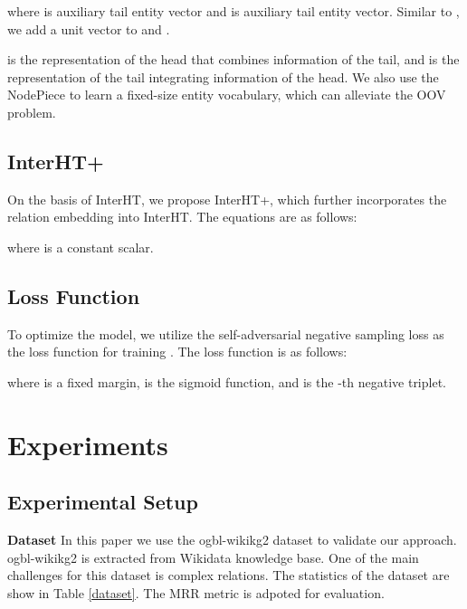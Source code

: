 \documentclass[11pt]{article}
\begin{document}
where  is auxiliary tail entity vector and  is auxiliary tail entity vector. Similar to \citet{long2021triplere}, we add a unit vector  to  and .



 is the representation of the head that combines information of the tail, and  is the representation of the tail integrating information of the head. We also use the NodePiece to learn a fixed-size entity vocabulary, which can alleviate the OOV problem.

\subsection{InterHT+}
On the basis of InterHT, we propose InterHT+, which further incorporates the relation embedding into InterHT. The equations are as follows:

where  is a constant scalar.

\subsection{Loss Function}
To optimize the model, we utilize the self-adversarial negative sampling loss as the loss function for training \cite{sun2019rotate}. The loss function is as follows:

where  is a fixed margin,  is the sigmoid function, and  is the -th negative triplet.

\section{Experiments}
\subsection{Experimental Setup}
\noindent\textbf{Dataset} In this paper we use the ogbl-wikikg2 dataset to validate our approach. ogbl-wikikg2 is extracted from Wikidata knowledge base. One of the main challenges for this dataset is complex relations. The statistics of the dataset are show in Table \ref{dataset}. The MRR metric is adpoted for evaluation.
\end{document}

